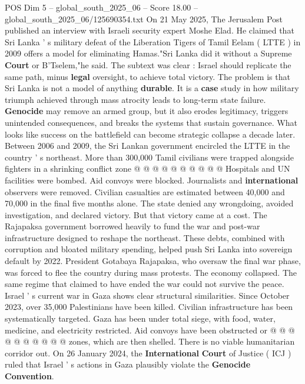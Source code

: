 \begin{textsample}{POS Dim 5 – global\_south\_2025\_06 – Score 18.00 – global\_south\_2025\_06/125690354.txt}  \label{ex:f5_pos_055}
On 21 May 2025, The Jerusalem Post published an interview with Israeli security expert Moshe Elad.
He claimed that Sri Lanka ' s military defeat of the Liberation Tigers of Tamil Eelam ( LTTE ) in 2009 offers a model for eliminating Hamas."Sri Lanka did it without a Supreme \textbf{Court} or B'Tselem,"he said.
The subtext was clear : Israel should replicate the same path, minus \textbf{legal} oversight, to achieve total victory.
The problem is that Sri Lanka is not a model of anything \textbf{durable}.
It is a \textbf{case} study in how military triumph achieved through mass atrocity leads to long-term state failure. \textbf{Genocide} may remove an armed group, but it also erodes legitimacy, triggers unintended consequences, and breaks the systems that sustain governance.
What looks like success on the battlefield can become strategic collapse a decade later.
Between 2006 and 2009, the Sri Lankan government encircled the LTTE in the country ' s northeast.
More than 300,000 Tamil civilians were trapped alongside fighters in a shrinking conflict zone @ @ @ @ @ @ @ @ @ @ Hospitals and UN facilities were bombed.
Aid convoys were blocked.
Journalists and \textbf{international} observers were removed.
Civilian casualties are estimated between 40,000 and 70,000 in the final five months alone.
The state denied any wrongdoing, avoided investigation, and declared victory.
But that victory came at a cost.
The Rajapaksa government borrowed heavily to fund the war and post-war infrastructure designed to reshape the northeast.
These debts, combined with corruption and bloated military spending, helped push Sri Lanka into sovereign default by 2022.
President Gotabaya Rajapaksa, who oversaw the final war phase, was forced to flee the country during mass protests.
The economy collapsed.
The same regime that claimed to have ended the war could not survive the peace.
Israel ' s current war in Gaza shows clear structural similarities.
Since October 2023, over 35,000 Palestinians have been killed.
Civilian infrastructure has been systematically targeted.
Gaza has been under total siege, with food, water, medicine, and electricity restricted.
Aid convoys have been obstructed or @ @ @ @ @ @ @ @ @ @ zones, which are then shelled.
There is no viable humanitarian corridor out.
On 26 January 2024, the \textbf{International} \textbf{Court} of Justice ( ICJ ) ruled that Israel ' s actions in Gaza plausibly violate the \textbf{Genocide} \textbf{Convention}.

\end{textsample}
